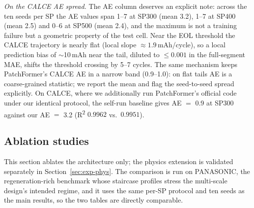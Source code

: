 \documentclass[final,5p,times,twocolumn]{elsarticle}
\begin{document}
\emph{On the CALCE AE spread.} The AE column deserves an
explicit note: across the ten seeds per SP the AE values span
1--7 at SP300 (mean 3.2), 1--7 at SP400 (mean 2.5) and 0--6 at
SP500 (mean 2.4), and the maximum is not a training failure but a
geometric property of the test cell. Near the EOL threshold the
CALCE trajectory is nearly flat (local slope $\approx 1.9$\,mAh/cycle),
so a local
prediction bias of $\sim$10\,mAh near the tail, diluted
to $\le 0.001$ in the full-segment MAE, shifts the threshold
crossing by 5--7 cycles.
The same mechanism keeps PatchFormer's CALCE AE in a narrow band
(0.9--1.0): on flat tails AE is a coarse-grained statistic; we report the
mean and flag the seed-to-seed spread explicitly. On CALCE, where we
additionally run PatchFormer's official code under our identical
protocol, the self-run baseline gives AE $=$ 0.9 at SP300 against our
AE $=$ 3.2 (R\textsuperscript{2} $0.9962$ vs.\ $0.9951$).

\subsection{Ablation studies}
\label{sec:ablation}

This section ablates the architecture only; the physics extension is
validated separately in Section~\ref{sec:exp-phys}. The comparison is run
on PANASONIC, the regeneration-rich benchmark whose staircase profiles
stress the multi-scale design's intended regime, and it uses the same
per-SP protocol and ten seeds as the main results, so the two tables
are directly comparable.
\end{document}
